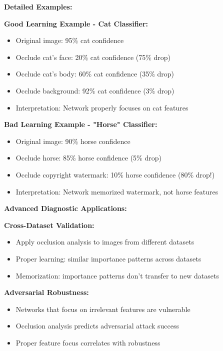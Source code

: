 \documentclass[12pt]{article}
\newcommand{\explanation}[1]{{\color{explanationcolor}#1}}
\begin{document}
\begin{enumerate}[(a)]
{    \textbf{Detailed Examples:}
    
    \explanation{
    \textbf{Good Learning Example - Cat Classifier:}
    \begin{itemize}
        \item Original image: 95\% cat confidence
        \item Occlude cat's face: 20\% cat confidence (75\% drop)
        \item Occlude cat's body: 60\% cat confidence (35\% drop)
        \item Occlude background: 92\% cat confidence (3\% drop)
        \item Interpretation: Network properly focuses on cat features
    \end{itemize}
    
    \textbf{Bad Learning Example - "Horse" Classifier:}
    \begin{itemize}
        \item Original image: 90\% horse confidence
        \item Occlude horse: 85\% horse confidence (5\% drop)
        \item Occlude copyright watermark: 10\% horse confidence (80\% drop!)
        \item Interpretation: Network memorized watermark, not horse features
    \end{itemize}
    }
    
    \textbf{Advanced Diagnostic Applications:}
    
    \explanation{
    \textbf{Cross-Dataset Validation:}
    \begin{itemize}
        \item Apply occlusion analysis to images from different datasets
        \item Proper learning: similar importance patterns across datasets
        \item Memorization: importance patterns don't transfer to new datasets
    \end{itemize}
    
    \textbf{Adversarial Robustness:}
    \begin{itemize}
        \item Networks that focus on irrelevant features are vulnerable
        \item Occlusion analysis predicts adversarial attack success
        \item Proper feature focus correlates with robustness
    \end{itemize}
    
}}
\end{enumerate}
\end{document}
